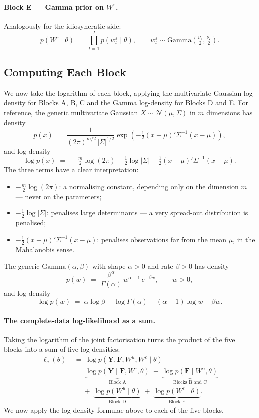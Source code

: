 \documentclass[11pt, a4paper, oneside]{article}
\newcommand{\mY}{\mathbf{Y}}
\newcommand{\mF}{\mathbf{F}}
\begin{document}
\paragraph{Block E — Gamma prior on $W^\varepsilon$.}
Analogously for the idiosyncratic side:
\[
p(W^\varepsilon \mid \theta) \;=\; \prod_{t=1}^{T} p(w^\varepsilon_t \mid \theta),
\qquad
w^\varepsilon_t \sim \mathrm{Gamma}(\tfrac{\nu_\varepsilon}{2}, \tfrac{\nu_\varepsilon}{2}).
\]

\subsection{Computing Each Block}

We now take the logarithm of each block, applying the multivariate
Gaussian log-density for Blocks A, B, C and the Gamma log-density for
Blocks D and E. For reference, the generic multivariate Gaussian
$X \sim \mathcal{N}(\mu, \Sigma)$ in $m$ dimensions has density
\[
p(x) \;=\; \frac{1}{(2\pi)^{m/2}\, |\Sigma|^{1/2}}
\exp\!\left(-\tfrac{1}{2}(x-\mu)'\Sigma^{-1}(x-\mu)\right),
\]
and log-density
\[
\log p(x) \;=\; -\tfrac{m}{2}\log(2\pi) - \tfrac{1}{2}\log|\Sigma|
- \tfrac{1}{2}(x-\mu)'\Sigma^{-1}(x-\mu).
\]
The three terms have a clear interpretation:
\begin{itemize}[leftmargin=1.5em, itemsep=2pt]
    \item $-\tfrac{m}{2}\log(2\pi)$: a normalising constant, depending
          only on the dimension $m$ — never on the parameters;
    \item $-\tfrac{1}{2}\log|\Sigma|$: penalises large determinants — a
          very spread-out distribution is penalised;
    \item $-\tfrac{1}{2}(x-\mu)'\Sigma^{-1}(x-\mu)$: penalises
          observations far from the mean $\mu$, in the Mahalanobis sense.
\end{itemize}
The generic $\mathrm{Gamma}(\alpha, \beta)$ with shape $\alpha > 0$ and
rate $\beta > 0$ has density
\[
p(w) \;=\; \frac{\beta^{\alpha}}{\Gamma(\alpha)}\, w^{\alpha-1}\, e^{-\beta w},
\qquad w > 0,
\]
and log-density
\[
\log p(w) \;=\; \alpha \log \beta - \log \Gamma(\alpha) + (\alpha - 1)\log w - \beta w.
\]

\paragraph{The complete-data log-likelihood as a sum.}
Taking the logarithm of the joint factorisation turns the product of
the five blocks into a sum of five log-densities:
\begin{align*}
\ell_c(\theta) \;&=\; \log p(\mY, \mF, W^u, W^\varepsilon \mid \theta) \\[4pt]
&=\; \underbrace{\log p(\mY \mid \mF, W^\varepsilon, \theta)}_{\text{Block A}}
\;+\; \underbrace{\log p(\mF \mid W^u, \theta)}_{\text{Blocks B and C}} \\[4pt]
&\quad\;+\; \underbrace{\log p(W^u \mid \theta)}_{\text{Block D}}
\;+\; \underbrace{\log p(W^\varepsilon \mid \theta)}_{\text{Block E}}.
\end{align*}
We now apply the log-density formulae above to each of the five blocks.
\end{document}
